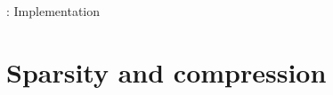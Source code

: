 \documentclass[handout]{beamer}
\newcommand{\real}{\mathbb{R}}
\newcommand{\cplx}{\mathbb{C}}
\newcommand{\conj}[1]{\overline{#1}}
\begin{document}
\begin{frame}[c]{\insertsection: Implementation}



\end{frame}


\section{Sparsity and compression} %
\label{sec:compression}
\end{document}
